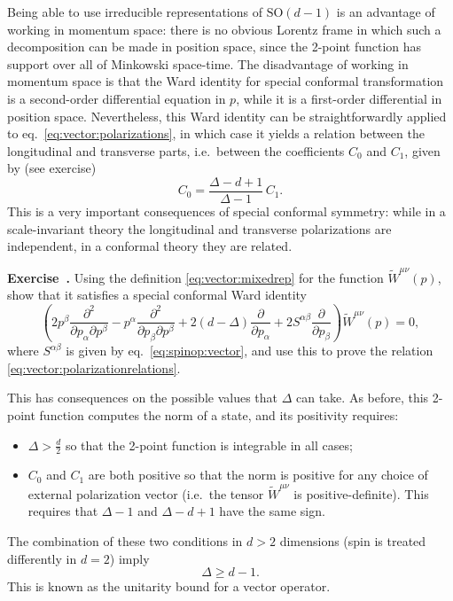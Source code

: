 \documentclass[a4paper,12pt]{article}
\numberwithin{equation}{section}
\newcounter{exercise}[section]
\newenvironment{exercise}[1][]%
	{\refstepcounter{exercise}\bigskip
	\begin{mdframed}[backgroundcolor=gray!20, linewidth=0]
	\noindent\textbf{Exercise~\thesection.\theexercise #1} \rmfamily}
  	{\end{mdframed}\bigskip}
\begin{document}
Being able to use irreducible representations of $\text{SO}(d-1)$ is an advantage of working in momentum space: there is no obvious Lorentz frame in which such a decomposition can be made in position space, since the 2-point function has support over all of Minkowski space-time. The disadvantage of working in momentum space is that the Ward identity for special conformal transformation is a second-order differential equation in $p$, while it is a first-order differential in position space.
Nevertheless, this Ward identity can be straightforwardly applied to eq.~\eqref{eq:vector:polarizations}, in which case it yields a relation between the longitudinal and transverse parts, i.e.~between the coefficients $C_0$ and $C_1$, given by (see exercise)
\begin{equation}
	C_0 = \frac{\Delta - d + 1}{\Delta - 1} \, C_1.
	\label{eq:vector:polarizationrelations}
\end{equation}
This is a very important consequences of special conformal symmetry: 
while in a scale-invariant theory the longitudinal and transverse polarizations are independent, in a conformal theory they are related.
%
\begin{exercise}
	Using the definition \eqref{eq:vector:mixedrep} for the function
	$\widetilde{W}^{\mu\nu}(p)$, show that it satisfies a special
	conformal Ward identity
	$$
	\left( 2 p^\beta
	\frac{\partial^2}{\partial p_\alpha \partial p^\beta}
	- p^\alpha
	\frac{\partial^2}{\partial p_\beta \partial p^\beta}
	+ 2 (d - \Delta) \frac{\partial}{\partial p_\alpha}
	+ 2 S^{\alpha\beta} \frac{\partial}{\partial p_\beta} \right)
	\widetilde{W}^{\mu\nu}(p) = 0,
	$$
	where $S^{\alpha\beta}$ is given by eq.~\eqref{eq:spinop:vector},
	and use this to prove the relation
	\eqref{eq:vector:polarizationrelations}.
\end{exercise}
%
This has consequences on the possible values that $\Delta$ can take. As before, this 2-point function computes the norm of a state, and its positivity requires:
\begin{itemize}

\item
$\Delta > \frac{d}{2}$ so that the 2-point function is integrable in all cases;

\item
$C_0$ and $C_1$ are both positive so that the norm is positive for any choice of external polarization vector (i.e.~the tensor $\widetilde{W}^{\mu\nu}$ is positive-definite). This requires that $\Delta - 1$ and $\Delta - d + 1$ have the same sign.

\end{itemize}
%
The combination of these two conditions in $d > 2$ dimensions (spin is treated differently in $d = 2$) imply
\begin{equation}
	\Delta \geq d - 1.
\end{equation}
This is known as the unitarity bound for a vector operator.
\end{document}

